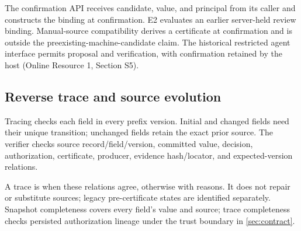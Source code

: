 The confirmation API receives candidate, value, and principal from its caller and constructs the binding at confirmation. E2 evaluates an earlier server-held review binding. Manual-source compatibility derives a certificate at confirmation and is outside the preexisting-machine-candidate claim. The historical restricted agent interface permits proposal and verification, with confirmation retained by the host (Online Resource 1, Section S5).

\subsection{Reverse trace and source evolution}

Tracing checks each field in every prefix version. Initial and changed fields need their unique transition; unchanged fields retain the exact prior source. The verifier checks source record/field/version, committed value, decision, authorization, certificate, producer, evidence hash/locator, and expected-version relations.

A trace is  when these relations agree, otherwise  with reasons. It does not repair or substitute sources; legacy pre-certificate states are identified separately. Snapshot completeness covers every field's value and source; trace completeness checks persisted authorization lineage under the trust boundary in \cref{sec:contract}.
